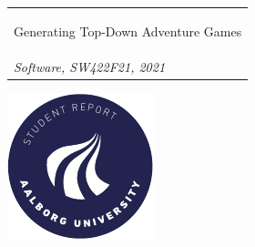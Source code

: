 \begin{titlepage}
{{\begin{tabular}{@{}p{\textwidth}@{}}
\begin{center}
{        Generating Top-Down Adventure Games%
      }
    \end{center}
   \begin{center}
    {\large
      Christian Houmann, Ivik Hostrup, Patrick Østergaard%
    }\\
    \vspace{0.4cm}
    {\large
      \textit{Software, SW422F21, 2021}%
    }
  \end{center}
   \vspace{0.2cm}
  \end{tabular}}}
  \vfill
  \begin{center}
    \includegraphics[width=0.2\paperwidth]{AAUgraphics/aau_logo_circle_en}%
  \end{center}
\end{titlepage}
\clearpage
